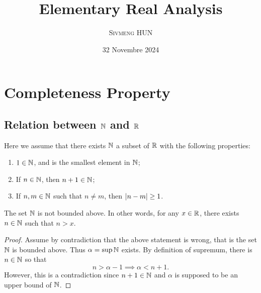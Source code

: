\documentclass[12pt]{article}
\title{Elementary Real Analysis}
\author{\textsc{Sivmeng HUN}}
\date{32 Novembre 2024}
\begin{document}
\maketitle

\section{Completeness Property}

\subsection{Relation between \(\mathbb{N}\) and \(\mathbb{R}\)}


Here we assume that there exists \(\mathbb{N}\) a subset of \(\mathbb{R}\) with the following
properties:
\begin{enumerate}[label = {(\roman*).}]
\item \(1\in\mathbb{N}\), and is the smallest element in \(\mathbb{N}\);
\item If \(n\in\mathbb{N}\), then \(n+1\in\mathbb{N}\);
\item If \(n,m\in\mathbb{N}\) such that \(n\neq m\), then
  \(\lvert n-m\rvert\geq 1\).
\end{enumerate}

\begin{theorem}
  The set \(\mathbb{N}\) is not bounded above. In other words,
  for any \(x\in\mathbb{R}\), there exists \(n\in\mathbb{N}\) such that \(n>x\). 
\end{theorem}
\begin{proof}
  Assume by contradiction that the above statement is wrong, that is
  the set \(\mathbb{N}\) is bounded above.
  Thus \(\alpha = \sup\mathbb{N}\) exists. By definition of supremum,
  there is \(n\in\mathbb{N}\) so that
  \[
    n > \alpha - 1 \implies \alpha < n+1.
  \]
  However, this is a contradiction since \(n+1\in\mathbb{N}\) and \(\alpha\)
  is supposed to be an upper bound of \(\mathbb{N}\).
\end{proof}
\end{document}
